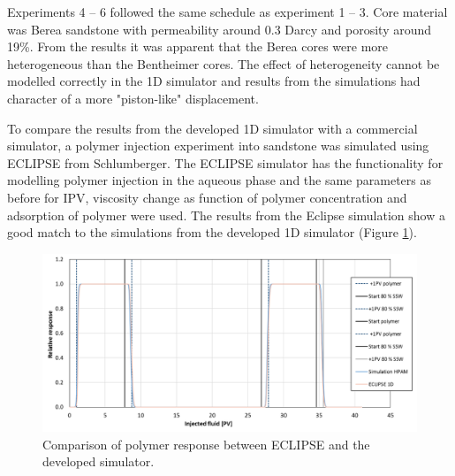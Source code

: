 \documentclass[energies,article,submit,moreauthors,pdftex]{Definitions/mdpi}
\begin{document}
Experiments 4 – 6 followed the same schedule as experiment 1 – 3. Core material was Berea sandstone with permeability around 0.3 Darcy and porosity around 19\%. From the results it was apparent that the Berea cores were more heterogeneous than the Bentheimer cores. The effect of heterogeneity cannot be modelled correctly in the 1D simulator and results from the simulations had character of a more "piston-like" displacement.

To compare the results from the developed 1D simulator with a commercial simulator, a polymer injection experiment into sandstone was simulated using ECLIPSE from Schlumberger.
The ECLIPSE simulator has the functionality for modelling polymer injection in the aqueous phase and the same parameters as before for IPV, viscosity change as function of polymer concentration and adsorption of polymer were used. The results from the Eclipse simulation show a good match to the simulations from the developed 1D simulator (Figure \ref{cht:simEcl}).

\begin{figure}[h!]
    \centering
    \includegraphics[width=.8\textwidth]{fig/simEcl.png}
    \caption{Comparison of polymer response between ECLIPSE and the developed simulator.}
    \label{cht:simEcl}
    \vspace{1cm}
\end{figure}


\end{document}
